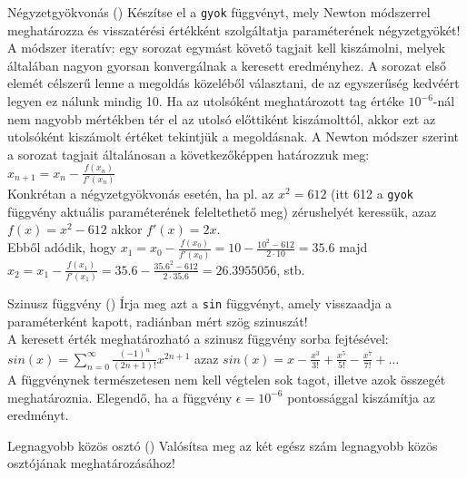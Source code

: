 \begin{frame}
    \begin{exampleblock}{Négyzetgyökvonás ()}
        \small
        Készítse el a \texttt{gyok} függvényt, mely Newton módszerrel meghatározza és visszatérési értékként szolgáltatja paraméterének négyzetgyökét! \\
        A módszer iteratív: egy sorozat egymást követő tagjait kell kiszámolni, melyek általában nagyon gyorsan konvergálnak a keresett eredményhez. A sorozat első elemét célszerű lenne a megoldás közeléből választani, de az egyszerűség kedvéért legyen ez nálunk mindig 10. Ha az utolsóként meghatározott tag értéke \( 10^{-6} \)-nál nem nagyobb mértékben tér el az utolsó előttiként kiszámolttól, akkor ezt az utolsóként kiszámolt értéket tekintjük a megoldásnak. A Newton módszer szerint a sorozat tagjait általánosan a következőképpen határozzuk meg: \( x_{n+1} = x_n - \frac{f(x_n)}{f'(x_n)} \) \\
        Konkrétan a négyzetgyökvonás esetén, ha pl. az \( x^2 = 612 \) (itt 612 a \texttt{gyok} függvény aktuális paraméterének feleltethető meg) zérushelyét keressük, azaz \( f(x) = x^2 - 612 \) akkor \( f'(x) = 2x \). \\
        Ebből adódik, hogy \( x_1 = x_0 - \frac{f(x_0)}{f'(x_0)} = 10 - \frac{10^2 - 612}{2 \cdot 10} = 35.6 \) majd \( x_2 = x_1 - \frac{f(x_1)}{f'(x_1)} = 35.6 - \frac{35.6^2 - 612}{2 \cdot 35.6} = 26.3955056 \), stb.
    \end{exampleblock}
\end{frame}

\begin{frame}
    \begin{exampleblock}{Szinusz függvény ()}
        Írja meg azt a \texttt{sin} függvényt, amely visszaadja a paraméterként kapott, radiánban mért szög szinuszát!\\
        \smallskip
        A keresett érték meghatározható a szinusz függvény sorba fejtésével: \( sin(x) = \sum_{n=0}^\infty \frac{(-1)^n}{(2n+1)!} x^{2n+1} \) azaz \( sin(x) = x-\frac{x^3}{3!}+\frac{x^5}{5!}-\frac{x^7}{7!}+\dots \)\\
        \smallskip
        A függvénynek természetesen nem kell végtelen sok tagot, illetve azok összegét meghatároznia. Elegendő, ha a függvény \( \epsilon = 10^{-6} \) pontossággal kiszámítja az eredményt.
    \end{exampleblock}
    \vfill
    \begin{exampleblock}{Legnagyobb közös osztó ()}
        Valósítsa meg az  két egész szám legnagyobb közös osztójának meghatározásához!
    \end{exampleblock}
\end{frame}
